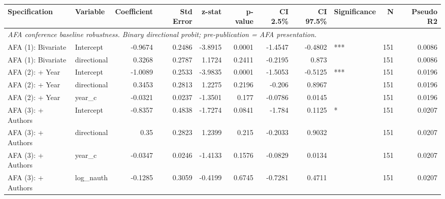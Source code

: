 \begin{tabular}{llrrrrrrlrr}
\toprule
Specification & Variable & Coefficient & Std Error & z-stat & p-value & CI 2.5\% & CI 97.5\% & Significance & N & Pseudo R2 \\
\midrule
\multicolumn{11}{l}{\textit{AFA conference baseline robustness. Binary directional probit; pre-publication = AFA presentation.}} \\[2pt]
AFA (1): Bivariate & Intercept & -0.9674 & 0.2486 & -3.8915 & 0.0001 & -1.4547 & -0.4802 & *** & 151 & 0.0086 \\
AFA (1): Bivariate & directional & 0.3268 & 0.2787 & 1.1724 & 0.2411 & -0.2195 & 0.873 &  & 151 & 0.0086 \\
AFA (2): + Year & Intercept & -1.0089 & 0.2533 & -3.9835 & 0.0001 & -1.5053 & -0.5125 & *** & 151 & 0.0196 \\
AFA (2): + Year & directional & 0.3453 & 0.2813 & 1.2275 & 0.2196 & -0.206 & 0.8967 &  & 151 & 0.0196 \\
AFA (2): + Year & year_c & -0.0321 & 0.0237 & -1.3501 & 0.177 & -0.0786 & 0.0145 &  & 151 & 0.0196 \\
AFA (3): + Authors & Intercept & -0.8357 & 0.4838 & -1.7274 & 0.0841 & -1.784 & 0.1125 & * & 151 & 0.0207 \\
AFA (3): + Authors & directional & 0.35 & 0.2823 & 1.2399 & 0.215 & -0.2033 & 0.9032 &  & 151 & 0.0207 \\
AFA (3): + Authors & year_c & -0.0347 & 0.0246 & -1.4133 & 0.1576 & -0.0829 & 0.0134 &  & 151 & 0.0207 \\
AFA (3): + Authors & log_nauth & -0.1285 & 0.3059 & -0.4199 & 0.6745 & -0.7281 & 0.4711 &  & 151 & 0.0207 \\
\bottomrule
\end{tabular}

